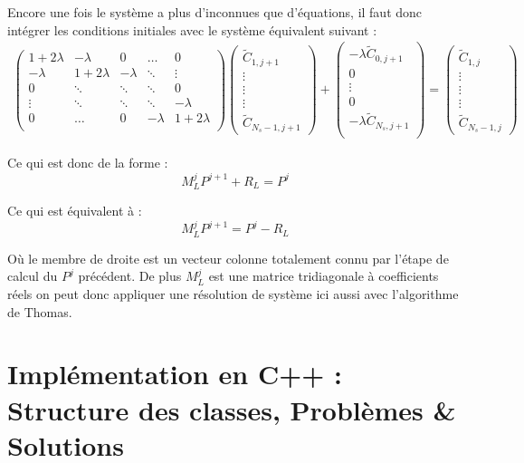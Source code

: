 \documentclass[11pt,a4paper]{article}
\begin{document}
Encore une fois le système a plus d'inconnues que d'équations, il faut donc intégrer les conditions initiales avec le système équivalent suivant :
\begin{align*}
\begin{pmatrix}
1 + 2\lambda & -\lambda & 0 & \hdots & 0 \\
-\lambda & 1 + 2\lambda & -\lambda & \ddots & \vdots \\
0 & \ddots & \ddots & \ddots & 0 \\
\vdots & \ddots & \ddots & \ddots & -\lambda \\
0 & \hdots & 0 & -\lambda & 1 + 2 \lambda \\
\end{pmatrix}
\begin{pmatrix}
\tilde{C}_{1,j+1} \\
\vdots \\
\vdots \\
\vdots \\
\tilde{C}_{N_s - 1,j+1} 
\end{pmatrix}
+
\begin{pmatrix}
-\lambda \tilde{C}_{0,j+1} \\
0 \\
\vdots \\
0 \\
-\lambda \tilde{C}_{N_s,j+1} \\
\end{pmatrix}
=
\begin{pmatrix}
\tilde{C}_{1,j} \\
\vdots \\
\vdots \\
\vdots \\
\tilde{C}_{N_s - 1,j}
\end{pmatrix}
\end{align*}

Ce qui est donc de la forme :
\[ M_{L}^j P^{j+1} + R_{L} = P^j\]

Ce qui est équivalent à :
\[ M_{L}^j P^{j+1} = P^j - R_{L}\]

Où le membre de droite est un vecteur colonne totalement connu par l'étape de calcul du $P^j$ précédent. De plus $M_{L}^j$ est une matrice tridiagonale à coefficients réels on peut donc appliquer une résolution de système ici aussi avec l'algorithme de Thomas.
\newpage
\section{Implémentation en C++ : Structure des classes, Problèmes \& Solutions}
\end{document}
